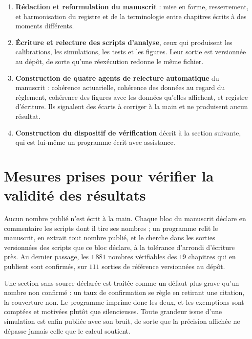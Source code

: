 \begin{enumerate}[itemsep=3pt]
\item \textbf{Rédaction et reformulation du manuscrit} : mise en forme, resserrement, et
      harmonisation du registre et de la terminologie entre chapitres écrits à des moments
      différents.

\item \textbf{Écriture et relecture des scripts d'analyse}, ceux qui produisent les calibrations,
      les simulations, les tests et les figures. Leur sortie est versionnée au dépôt, de sorte
      qu'une réexécution redonne le même fichier.

\item \textbf{Construction de quatre agents de relecture automatique} du manuscrit : cohérence
      actuarielle, cohérence des données au regard du règlement, cohérence des figures avec les
      données qu'elles affichent, et registre d'écriture. Ils signalent des écarts à corriger à la
      main et ne produisent aucun résultat.

\item \textbf{Construction du dispositif de vérification} décrit à la section suivante, qui est
      lui-même un programme écrit avec assistance.
\end{enumerate}

\section{Mesures prises pour vérifier la validité des résultats}

Aucun nombre publié n'est écrit à la main. Chaque bloc du manuscrit déclare en commentaire les
scripts dont il tire ses nombres ; un programme relit le manuscrit, en extrait tout nombre publié,
et le cherche dans les sorties versionnées des scripts que ce bloc déclare, à la tolérance
d'arrondi d'écriture près. Au dernier passage, les $1\,881$ nombres vérifiables des $19$ chapitres
qui en publient sont confirmés, sur $111$ sorties de référence versionnées au dépôt.

Une section sans source déclarée est traitée comme un défaut plus grave qu'un nombre non confirmé :
un taux de confirmation se règle en retirant une citation, la couverture non. Le programme imprime
donc les deux, et les exemptions sont comptées et motivées plutôt que silencieuses. Toute grandeur
issue d'une simulation est enfin publiée avec son bruit, de sorte que la précision affichée ne
dépasse jamais celle que le calcul soutient.

